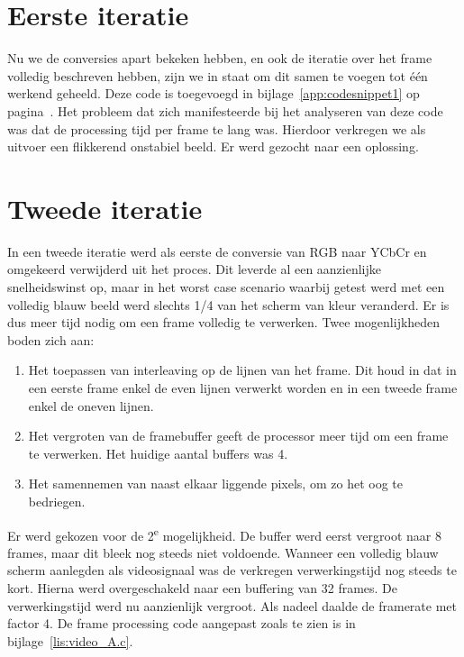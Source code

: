 \section{Eerste iteratie}
	\par Nu we de conversies apart bekeken hebben, en ook de iteratie over het frame volledig beschreven hebben, zijn we in staat om dit samen te voegen tot \'e\'en werkend geheeld. Deze code is toegevoegd in bijlage~\ref{app:codesnippet1} op pagina~\pageref{app:codesnippet1}. Het probleem dat zich manifesteerde bij het analyseren van deze code was dat de processing tijd per frame te lang was. Hierdoor verkregen we als uitvoer een flikkerend onstabiel beeld. Er werd gezocht naar een oplossing.

\section{Tweede iteratie}
	\par In een tweede iteratie werd als eerste de conversie van RGB naar YCbCr en omgekeerd verwijderd uit het proces. Dit leverde al een aanzienlijke snelheidswinst op, maar in het worst case scenario waarbij getest werd met een volledig blauw beeld werd slechts 1/4 van het scherm van kleur veranderd. Er is dus meer tijd nodig om een frame volledig te verwerken. Twee mogenlijkheden boden zich aan:

		\begin{enumerate}
			\item Het toepassen van interleaving op de lijnen van het frame. Dit houd in dat in een eerste frame enkel de even lijnen verwerkt worden en in een tweede frame enkel de oneven lijnen.
			\item Het vergroten van de framebuffer geeft de processor meer tijd om een frame te verwerken. Het huidige aantal buffers was 4.
			\item Het samennemen van naast elkaar liggende pixels, om zo het oog te bedriegen.
		\end{enumerate}

	\par Er werd gekozen voor de 2\textsuperscript{e} mogelijkheid. De buffer werd eerst vergroot naar 8 frames, maar dit bleek nog steeds niet voldoende. Wanneer een volledig blauw scherm aanlegden als videosignaal was de verkregen verwerkingstijd nog steeds te kort. Hierna werd overgeschakeld naar een buffering van 32 frames. De verwerkingstijd werd nu aanzienlijk vergroot. Als nadeel daalde de framerate met factor 4. De frame processing code aangepast zoals te zien is in bijlage~\ref{lis:video_A.c}.

